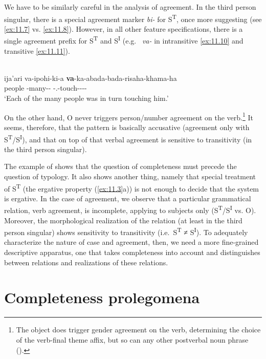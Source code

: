 \documentclass[output=paper]{langsci/langscibook}
\begin{document}
We have to be similarly careful in the analysis of  agreement. In the
third person singular, there is a special agreement marker \emph{bi-} for
S\textsuperscript{T}, once more suggesting  (see \ref{ex:11.7} vs. \ref{ex:11.8}).
However, in all other feature specifications, there is a single agreement
prefix for S\textsuperscript{T} and S\textsuperscript{I} (e.g.\ \Tpl{}
\emph{va-} in intransitive \eqref{ex:11.10} and transitive \eqref{ex:11.11}).

\ea%
    \label{ex:11.11}  \parencite[281]{ChapmanDerbyshire1991}\\
    \gll ija'ari  va-ipohi-ki-a \textbf{va}-ka-abada-bada-risaha-khama-ha\\
        people  \Tpl{}-many-\Desc-\Erg{} \Tpl-\Tr.\Distr{}-touch-\Red{}-\Iter-\Distr-\Th{}\\
    \glt ‘Each of the many people was in turn touching him.’
\z

On the other hand, O never triggers person/number agreement on the
verb.\footnote{The object does trigger gender agreement on the verb,
determining the choice of the verb-final theme affix, but so can any other
postverbal noun phrase (\citealt[288]{ChapmanDerbyshire1991}).} It seems,
therefore, that the pattern is basically accusative (agreement only with
S\textsuperscript{T}/S\textsuperscript{I}), and that on top of that verbal
agreement is sensitive to transitivity (in the third person singular).

The example of  shows that the question of completeness must precede the
question of  typology. It also shows another thing, namely that
special treatment of S\textsuperscript{T} (the ergative property (\ref{ex:11.3}a)) is not
enough to decide that the system is ergative. In the case of  agreement,
we observe that a particular grammatical relation, verb agreement, is
incomplete, applying to subjects only
(S\textsuperscript{T}/S\textsuperscript{I} vs. O). Moreover, the morphological
realization of the relation (at least in the third person singular) shows
sensitivity to transitivity (i.e.\ S\textsuperscript{T} ≠ S\textsuperscript{I}).
To adequately characterize the nature of  case and agreement, then, we
need a more fine-grained descriptive apparatus, one that takes completeness
into account and distinguishes between relations and realizations of these
relations.

\section{Completeness prolegomena}\label{sec:11.3}
\end{document}
